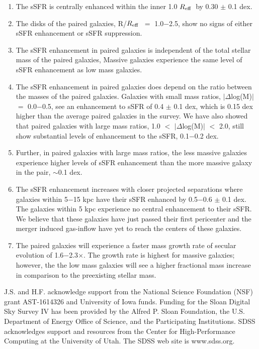 \documentclass[iop,revtex4,twocolumn,apj,numberedappendix,appendixfloats]{emulateapj}
\newcommand{\reff}{$R_{\rm eff}$}
\begin{document}
\begin{enumerate}
\item The sSFR is centrally enhanced within the inner 1.0 \reff\ by 0.30 $\pm$ 0.1 dex. 
\item The disks of the paired galaxies, R/\reff\ $=$ 1.0$-$2.5, show no signs of either sSFR enhancement or sSFR suppression. 
\item The sSFR enhancement in paired galaxies is independent of the total stellar mass of the paired galaxies, Massive galaxies experience the same level of sSFR enhancement as low mass galaxies.
\item The sSFR enhancement in paired galaxies does depend on the ratio between the masses of the paired galaxies. Galaxies with small mass ratios, $|\Delta$log(M)$|$ $=$ 0.0$-$0.5, see an enhancement to sSFR of 0.4 $\pm$ 0.1 dex, which is 0.15 dex higher than the average paired galaxies in the survey. We have also showed that paired galaxies with large mass ratios, 1.0 $<$ $|\Delta$log(M)$|$ $<$ 2.0, still show substantial levels of enhancement to the sSFR, 0.1$-$0.2 dex. 
\item Further, in paired galaxies with large mass ratios, the less massive galaxies experience higher levels of sSFR enhancement than the more massive galaxy in the pair, $\sim$0.1 dex.
\item The sSFR enhancement increases with closer projected separations where galaxies within 5$-$15 kpc have their sSFR enhanced by 0.5$-$0.6 $\pm$ 0.1 dex. The galaxies within 5 kpc experience no central enhancement to their sSFR. We believe that these galaxies have just passed their first pericenter and the merger induced gas-inflow have yet to reach the centers of these galaxies.
\item The paired galaxies will experience a faster mass growth rate of secular evolution of 1.6$-$2.3$\times$. The growth rate is highest for massive galaxies; however, the the low mass galaxies will see a higher fractional mass increase in comparison to the preexisting stellar mass. 

\end{enumerate}

\acknowledgments

J.S. and H.F. acknowledge support from the National Science Foundation (NSF) grant AST-1614326 and University of Iowa funds. Funding for the Sloan Digital Sky Survey IV has been provided by the Alfred P. Sloan Foundation, the U.S. Department of Energy Office of Science, and the Participating Institutions. SDSS acknowledges support and resources from the Center for High-Performance Computing at the University of Utah. The SDSS web site is www.sdss.org.
\end{document}
